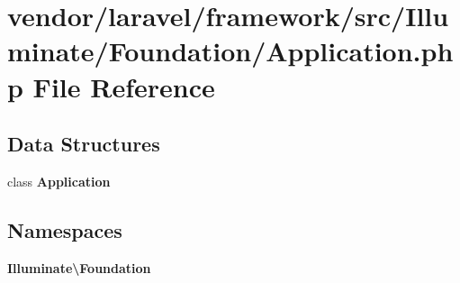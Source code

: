 \section{vendor/laravel/framework/src/\+Illuminate/\+Foundation/\+Application.php File Reference}
\label{laravel_2framework_2src_2_illuminate_2_foundation_2_application_8php}
\subsection*{Data Structures}
\begin{DoxyCompactItemize}
\item 
class {\bf Application}
\end{DoxyCompactItemize}
\subsection*{Namespaces}
\begin{DoxyCompactItemize}
\item 
 {\bf Illuminate\textbackslash{}\+Foundation}
\end{DoxyCompactItemize}
